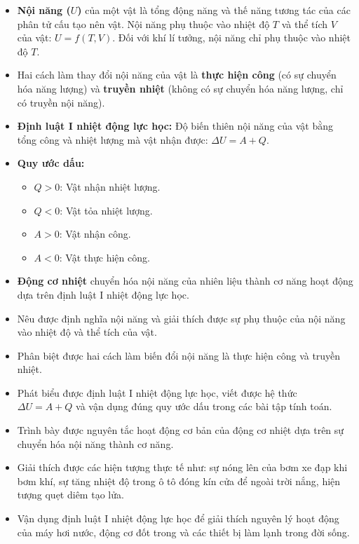 \begin{kienthuc}
\begin{itemize}
    \item \textbf{Nội năng ($U$)} của một vật là tổng động năng và thế năng tương tác của các phân tử cấu tạo nên vật. Nội năng phụ thuộc vào nhiệt độ $T$ và thể tích $V$ của vật: $U = f(T, V)$. Đối với khí lí tưởng, nội năng chỉ phụ thuộc vào nhiệt độ $T$.
    \item Hai cách làm thay đổi nội năng của vật là \textbf{thực hiện công} (có sự chuyển hóa năng lượng) và \textbf{truyền nhiệt} (không có sự chuyển hóa năng lượng, chỉ có truyền nội năng).
    \item \textbf{Định luật I nhiệt động lực học:} Độ biến thiên nội năng của vật bằng tổng công và nhiệt lượng mà vật nhận được: $\Delta U = A + Q$.
    \item \textbf{Quy ước dấu:}
    \begin{itemize}
        \item $Q > 0$: Vật nhận nhiệt lượng.
        \item $Q < 0$: Vật tỏa nhiệt lượng.
        \item $A > 0$: Vật nhận công.
        \item $A < 0$: Vật thực hiện công.
    \end{itemize}
    \item \textbf{Động cơ nhiệt} chuyển hóa nội năng của nhiên liệu thành cơ năng hoạt động dựa trên định luật I nhiệt động lực học.
\end{itemize}
\end{kienthuc}

\begin{emdahoc}
\begin{itemize}
    \item Nêu được định nghĩa nội năng và giải thích được sự phụ thuộc của nội năng vào nhiệt độ và thể tích của vật.
    \item Phân biệt được hai cách làm biến đổi nội năng là thực hiện công và truyền nhiệt.
    \item Phát biểu được định luật I nhiệt động lực học, viết được hệ thức $\Delta U = A + Q$ và vận dụng đúng quy ước dấu trong các bài tập tính toán.
    \item Trình bày được nguyên tắc hoạt động cơ bản của động cơ nhiệt dựa trên sự chuyển hóa nội năng thành cơ năng.
\end{itemize}
\end{emdahoc}

\begin{emcothe}
\begin{itemize}
    \item Giải thích được các hiện tượng thực tế như: sự nóng lên của bơm xe đạp khi bơm khí, sự tăng nhiệt độ trong ô tô đóng kín cửa để ngoài trời nắng, hiện tượng quẹt diêm tạo lửa.
    \item Vận dụng định luật I nhiệt động lực học để giải thích nguyên lý hoạt động của máy hơi nước, động cơ đốt trong và các thiết bị làm lạnh trong đời sống.
\end{itemize}
\end{emcothe}
